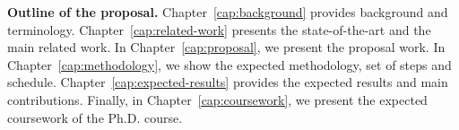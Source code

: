 	\textbf{Outline of the proposal.} Chapter~\ref{cap:background} provides background and terminology. Chapter~\ref{cap:related-work} presents the state-of-the-art and the main related work. In Chapter~\ref{cap:proposal}, we present the proposal work. In Chapter~\ref{cap:methodology}, we show the expected methodology, set of steps and schedule. Chapter~\ref{cap:expected-results} provides the expected results and main contributions. Finally, in Chapter~\ref{cap:coursework}, we present the expected coursework of the Ph.D. course.


